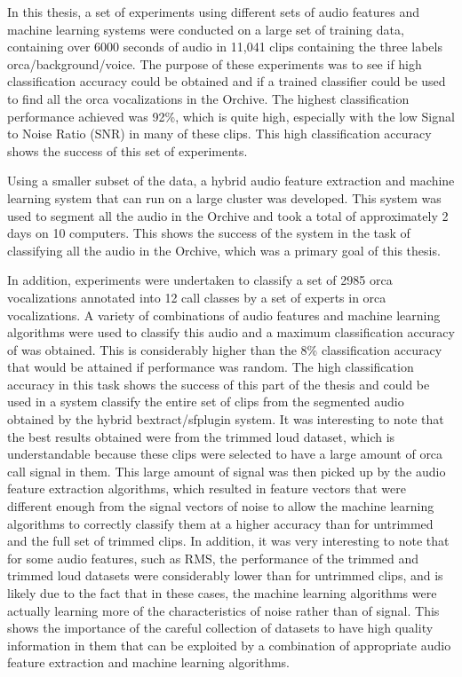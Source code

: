 In this thesis, a set of experiments using different sets of audio
features and machine learning systems were conducted on a large set of
training data, containing over 6000 seconds of audio in 11,041 clips
containing the three labels orca/background/voice.  The purpose of
these experiments was to see if high classification accuracy could be
obtained and if a trained classifier could be used to find all the
orca vocalizations in the Orchive.  The highest classification
performance achieved was 92\%, which is quite high, especially with
the low Signal to Noise Ratio (SNR) in many of these clips.  This high
classification accuracy shows the success of this set of experiments.

Using a smaller subset of the data, a hybrid audio feature extraction
and machine learning system that can run on a large cluster was
developed.  This system was used to segment all the audio in the
Orchive and took a total of approximately 2 days on 10 computers.
This shows the success of the system in the task of classifying all
the audio in the Orchive, which was a primary goal of this thesis.

In addition, experiments were undertaken to classify a set of 2985
orca vocalizations annotated into 12 call classes by a set of experts
in orca vocalizations.  A variety of combinations of audio features
and machine learning algorithms were used to classify this audio and a
maximum classification accuracy of \classificationAccuracyOBV was
obtained.  This is considerably higher than the 8\% classification
accuracy that would be attained if performance was random.  The high
classification accuracy in this task shows the success of this part of
the thesis and could be used in a system classify the entire set of
clips from the segmented audio obtained by the hybrid
bextract/sfplugin system.  It was interesting to note that the best
results obtained were from the trimmed loud dataset, which is
understandable because these clips were selected to have a large
amount of orca call signal in them.  This large amount of signal was
then picked up by the audio feature extraction algorithms, which
resulted in feature vectors that were different enough from the signal
vectors of noise to allow the machine learning algorithms to correctly
classify them at a higher accuracy than for untrimmed and the full set
of trimmed clips.  In addition, it was very interesting to note that
for some audio features, such as RMS, the performance of the trimmed
and trimmed loud datasets were considerably lower than for untrimmed
clips, and is likely due to the fact that in these cases, the machine
learning algorithms were actually learning more of the characteristics
of noise rather than of signal.  This shows the importance of the
careful collection of datasets to have high quality information in
them that can be exploited by a combination of appropriate audio
feature extraction and machine learning algorithms.

